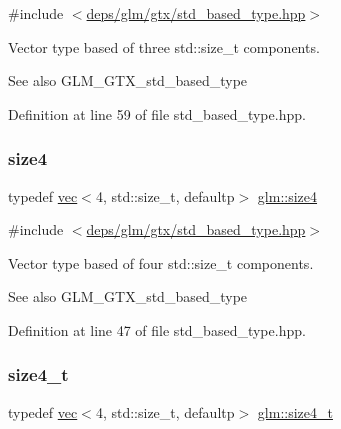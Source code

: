 {\ttfamily \#include $<$\hyperlink{std__based__type_8hpp}{deps/glm/gtx/std\+\_\+based\+\_\+type.\+hpp}$>$}

Vector type based of three std\+::size\+\_\+t components. \begin{DoxySeeAlso}{See also}
G\+L\+M\+\_\+\+G\+T\+X\+\_\+std\+\_\+based\+\_\+type 
\end{DoxySeeAlso}


Definition at line 59 of file std\+\_\+based\+\_\+type.\+hpp.

\mbox{\label{group__gtx__std__based__type_ga6051b5077b52ff8ea48a5207d5076aa5}} 
\subsubsection{\texorpdfstring{size4}{size4}}
{\footnotesize\ttfamily typedef \hyperlink{structglm_1_1vec}{vec}$<$4, std\+::size\+\_\+t, defaultp$>$ \hyperlink{group__gtx__std__based__type_ga6051b5077b52ff8ea48a5207d5076aa5}{glm\+::size4}}



{\ttfamily \#include $<$\hyperlink{std__based__type_8hpp}{deps/glm/gtx/std\+\_\+based\+\_\+type.\+hpp}$>$}

Vector type based of four std\+::size\+\_\+t components. \begin{DoxySeeAlso}{See also}
G\+L\+M\+\_\+\+G\+T\+X\+\_\+std\+\_\+based\+\_\+type 
\end{DoxySeeAlso}


Definition at line 47 of file std\+\_\+based\+\_\+type.\+hpp.

\mbox{\label{group__gtx__std__based__type_ga2bb2915bb83bb9d7a2967fe20aa7d2a5}} 
\subsubsection{\texorpdfstring{size4\+\_\+t}{size4\_t}}
{\footnotesize\ttfamily typedef \hyperlink{structglm_1_1vec}{vec}$<$4, std\+::size\+\_\+t, defaultp$>$ \hyperlink{group__gtx__std__based__type_ga2bb2915bb83bb9d7a2967fe20aa7d2a5}{glm\+::size4\+\_\+t}}




